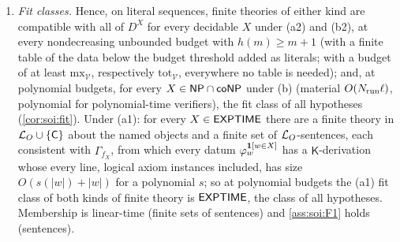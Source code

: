 \begin{theorem}
\begin{enumerate}[label=(\roman*),leftmargin=*]
\item \emph{Fit classes.} Hence, on literal sequences, finite theories of either kind are compatible with all of $D^X$ for every decidable $X$ under (a2) and (b2), at every nondecreasing unbounded budget with $h(m)\ge m+1$ (with a finite table of the data below the budget threshold added as literals; with a budget of at least $\mathrm{mx}_{\mathcal V}$, respectively $\mathrm{tot}_{\mathcal V}$, everywhere no table is needed); and, at polynomial budgets, for every $X\in\mathsf{NP}\cap\mathsf{coNP}$ under (b) (material $O(N_{\rm run}\ell)$, polynomial for polynomial-time verifiers), the fit class of all hypotheses (\cref{cor:soi:fit}). Under (a1): for every $X\in\mathsf{EXPTIME}$ there are a finite theory in $\mathcal{L}_{O}\cup\{\mathsf C\}$ about the named objects and a finite set of $\mathcal{L}_{O}$-sentences, each consistent with $\Gamma_{f_X}$, from which every datum $\varphi_w^{\mathbf{1}[w\in X]}$ has a $\mathsf K$-derivation whose every line, logical axiom instances included, has size $O(s(\lvert w\rvert)+\lvert w\rvert)$ for a polynomial $s$; so at polynomial budgets the (a1) fit class of both kinds of finite theory is $\mathsf{EXPTIME}$, the class of all hypotheses. Membership is linear-time (finite sets of sentences) and \cref{ass:soi:F1} holds (sentences).
\end{enumerate}
\end{theorem}

